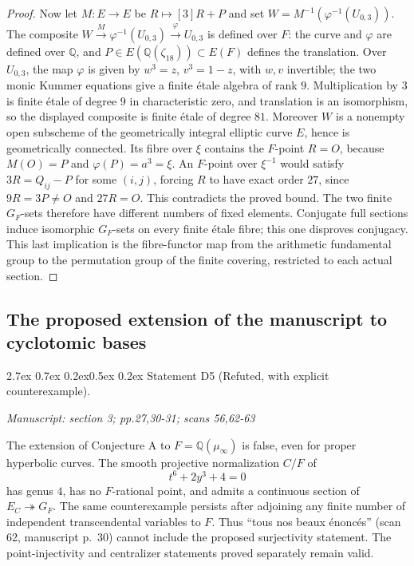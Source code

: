 \documentclass[11pt,a4paper]{article}
\makeatletter
\newcommand{\passage}[1]{\par\smallskip\noindent\textit{Manuscript: #1}\par\smallskip}
\renewcommand\paragraph{\@startsection{paragraph}{4}{\z@}%
  {2.7ex \@plus 0.7ex \@minus 0.2ex}{0.5ex \@plus 0.2ex}%
  {\normalfont\normalsize\bfseries}}
\makeatother
\begin{document}
\begin{proof}
Now let $M:E\to E$ be $R\mapsto[3]R+P$ and set
$W=M^{-1}(\varphi^{-1}(U_{0,3}))$.  The composite
$W\xrightarrow{M}\varphi^{-1}(U_{0,3})\xrightarrow{\varphi}U_{0,3}$
is defined over $F$: the curve and $\varphi$ are defined over $\mathbb Q$,
and $P\in E(\mathbb Q(\zeta_{18}))\subset E(F)$ defines the translation.
Over $U_{0,3}$, the map $\varphi$ is given by
$w^3=z$, $v^3=1-z$, with $w,v$ invertible; the two monic Kummer
equations give a finite \'etale algebra of rank $9$.
Multiplication by $3$ is finite \'etale of degree $9$ in characteristic
zero, and translation is an isomorphism, so the displayed composite is
finite \'etale of degree $81$.  Moreover $W$ is a nonempty open
subscheme of the geometrically integral elliptic curve $E$, hence is
geometrically connected.  Its fibre over $\xi$ contains the $F$-point
$R=O$, because $M(O)=P$ and $\varphi(P)=a^3=\xi$.
An $F$-point over $\xi^{-1}$ would satisfy
$3R=Q_{ij}-P$ for some $(i,j)$, forcing $R$ to have exact order $27$,
since $9R=3P\ne O$ and $27R=O$.  This contradicts the proved bound.
The two finite $G_F$-sets therefore have
different numbers of fixed elements.  Conjugate full sections induce
isomorphic $G_F$-sets on every finite \'etale fibre; this one disproves
conjugacy.  This last implication is the fibre-functor map from the
arithmetic fundamental group to the permutation group of the finite
covering, restricted to each actual section.
\end{proof}

\subsection{The proposed extension of the manuscript to cyclotomic bases}

\paragraph{Statement D5 (Refuted, with explicit counterexample).}\label{res:D5}
\passage{section 3; pp.27,30-31; scans 56,62-63}

The extension of Conjecture A to $F=\mathbb Q(\mu_\infty)$ is false,
even for proper hyperbolic curves.  The smooth projective normalization
$C/F$ of
\[
                         t^6+2y^3+4=0
\]
has genus $4$, has no $F$-rational point, and admits a continuous section
of $E_C\twoheadrightarrow G_F$.  The same counterexample persists after
adjoining any finite number of independent transcendental variables to
$F$.  Thus ``tous nos beaux \'enonc\'es'' (scan 62, manuscript p.~30) cannot include
the proposed surjectivity statement.  The point-injectivity and centralizer
statements proved separately remain valid.
\end{document}
